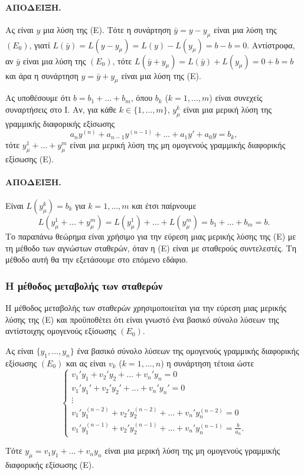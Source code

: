 \documentclass[11pt,a4paper,twoside]{book}
\newcommand{\titlefont}[1]{{\fontfamily{maksf}\selectfont #1}}
\newcounter{thewrhma}[chapter]
\renewcommand{\thethewrhma}{\thechapter.\arabic{thewrhma}}
\newcommand{\thewr}{\refstepcounter{thewrhma}{\bf\titlefont{\textcolor{secondarycolor}{\large Θεώρημα\hspace{2mm}\thethewrhma}}}\hspace{1mm}}{}
\newenvironment{Thewrhma}[1]
{\begin{tcolorbox}[title=\thewr\ \ :\ \  {\textcolor{black}{\bf{\large\titlefont{#1}}}},
breakable,
enhanced standard,
titlerule=-.2pt,
toprule=0pt, 
rightrule=0pt, 
bottomrule=0pt,
colback=white,
left=2mm,
top=1mm,
bottom=0mm,
boxrule=0pt,
colframe=white,
borderline west={1.5mm}{0pt}{secondarycolor},
leftrule=2mm,
sharp corners,
coltitle=secondarycolor]}
{\end{tcolorbox}}
\begin{document}
\paragraph{ΑΠΟΔΕΙΞΗ.} Ας είναι $y$ μια λύση της (Ε). Τότε η συνάρτηση $\bar{y} = y-y_\mu$ είναι μια λύση της $(E_0)$, γιατί $L(\bar{y})=L(y-y_\mu)=L(y)-L(y_\mu)=b-b=0$. Αντίστροφα, αν $\bar{y}$ είναι μια λύση της $(E_0)$, τότε $L(\bar{y}+y_\mu)=L(\bar{y})+L(y_\mu)=0+b=b$ και άρα η συνάρτηση $y=\bar{y}+y_\mu$ είναι μια λύση της (Ε).

\begin{Thewrhma}{13}
Ας υποθέσουμε ότι $b=b_1+\dots+b_m$, όπου $b_k$ ($k=1,\dots,m$) είναι συνεχείς συναρτήσεις στο Ι. Αν, για κάθε $k\in\{1,\dots,m\}$, $y_\mu^k$ είναι μια μερική λύση της γραμμικής διαφορικής εξίσωσης
\[
    a_n y^{(n)} + a_{n-1} y^{(n-1)} + \dots + a_1 y' + a_0 y = b_k,
\]
τότε $y_\mu^1+\dots+y_\mu^m$ είναι μια μερική λύση της μη ομογενούς γραμμικής διαφορικής εξίσωσης (Ε).
\end{Thewrhma}

\paragraph{ΑΠΟΔΕΙΞΗ.} Είναι $L(y_\mu^k) = b_k$ για $k=1,\dots,m$ και έτσι παίρνουμε
\[
    L(y_\mu^1+\dots+y_\mu^m) = L(y_\mu^1)+\dots+L(y_\mu^m) = b_1+\dots+b_m = b.
\]
Το παραπάνω θεώρημα είναι χρήσιμο για την εύρεση μιας μερικής λύσης της (Ε) με τη μέθοδο των αγνώστων σταθερών, όταν η (Ε) είναι με σταθερούς συντελεστές. Τη μέθοδο αυτή θα την εξετάσουμε στο επόμενο εδάφιο.

\subsubsection{Η μέθοδος μεταβολής των σταθερών}
Η μέθοδος μεταβολής των σταθερών χρησιμοποιείται για την εύρεση μιας μερικής λύσης της (Ε) και προϋποθέτει ότι είναι γνωστό ένα βασικό σύνολο λύσεων της αντίστοιχης ομογενούς εξίσωσης $(E_0)$.

\begin{Thewrhma}{14}
Ας είναι $\{y_1,\dots,y_n\}$ ένα βασικό σύνολο λύσεων της ομογενούς γραμμικής διαφορικής εξίσωσης $(E_0)$ και ας είναι $v_k$ ($k=1,\dots,n$) η συνάρτηση τέτοια ώστε
\[
    \begin{cases}
        v_1' y_1 + v_2' y_2 + \dots + v_n' y_n = 0 \\
        v_1' y_1' + v_2' y_2' + \dots + v_n' y_n' = 0 \\
        \vdots \\
        v_1' y_1^{(n-2)} + v_2' y_2^{(n-2)} + \dots + v_n' y_n^{(n-2)} = 0 \\
        v_1' y_1^{(n-1)} + v_2' y_2^{(n-1)} + \dots + v_n' y_n^{(n-1)} = \frac{b}{a_n}.
    \end{cases}
\]


Τότε $y_\mu=v_1 y_1 + \dots + v_n y_n$ είναι μια μερική λύση της μη ομογενούς γραμμικής διαφορικής εξίσωσης (Ε).
\end{Thewrhma}
\end{document}
